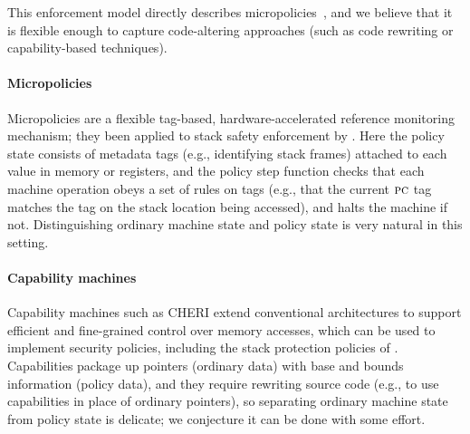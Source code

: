 \documentclass[acmsmall,review,anonymous]{acmart}\settopmatter{printfolios=true,printccs=false,printacmref=false}
\begin{document}

This enforcement model directly describes
micropolicies~\citep{pump_oakland2015}, and we believe that it is
flexible enough to capture code-altering approaches (such as code rewriting
or capability-based techniques).

\newcommand{\TAGS}{\mathcal{T}}
\newcommand{\tagname}{t}
\newcommand{\uP}{{\mu P}}

\paragraph*{Micropolicies}
%
Micropolicies are a flexible tag-based, hardware-accelerated
reference monitoring mechanism; they been applied to stack safety
enforcement by \citet{DBLP:conf/sp/RoesslerD18}.
Here the policy state consists of metadata tags (e.g., identifying stack frames)
attached to each value in memory or registers, and the policy step
function
checks that each machine operation obeys a set of rules on tags
(e.g., that the current $\textsc{pc}$ tag matches the tag on the stack
location being accessed), and halts the machine if not.  Distinguishing
ordinary machine state and policy state is very natural in this setting.

\paragraph*{Capability machines}
%
Capability machines such as CHERI \citep{Woodruff+14} extend conventional
architectures to support efficient and fine-grained control over memory
accesses, which can be used to implement security policies, including
the stack protection policies of
\citet{Skorstengaard+19,Skorstengaard+19b}.
Capabilities package up pointers
(ordinary data) with base and bounds information (policy data),
and they require rewriting source code (e.g., to use capabilities in place
of ordinary pointers), so separating ordinary machine state from policy
state is delicate; we conjecture it can be done with some effort.
\end{document}
